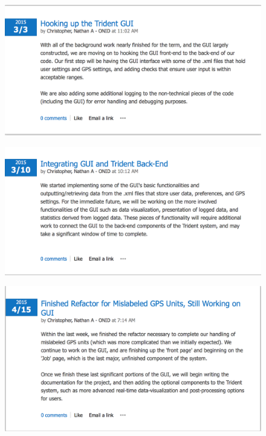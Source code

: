 \documentclass[12pt]{article}
\begin{document}
\begin{figure}[H]
\centering
\includegraphics[scale=0.5]{blog_posts/2015_3_3.png}
\label{fig:my_label}
\end{figure}

\begin{figure}[H]
\centering
\includegraphics[scale=0.5]{blog_posts/2015_3_10.png}
\label{fig:my_label}
\end{figure}

\begin{figure}[H]
\centering
\includegraphics[scale=0.5]{blog_posts/2015_4_15.png}
\label{fig:my_label}
\end{figure}
\end{document}

